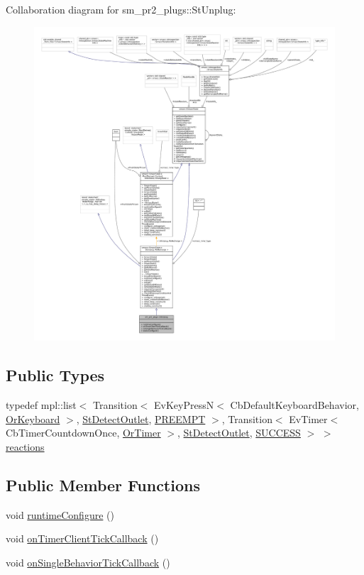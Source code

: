 Collaboration diagram for sm\+\_\+pr2\+\_\+plugs\+:\+:St\+Unplug\+:
\nopagebreak
\begin{figure}[H]
\begin{center}
\leavevmode
\includegraphics[width=350pt]{structsm__pr2__plugs_1_1StUnplug__coll__graph}
\end{center}
\end{figure}
\subsection*{Public Types}
\begin{DoxyCompactItemize}
\item 
typedef mpl\+::list$<$ Transition$<$ Ev\+Key\+PressN$<$ Cb\+Default\+Keyboard\+Behavior, \hyperlink{classsm__pr2__plugs_1_1OrKeyboard}{Or\+Keyboard} $>$, \hyperlink{structsm__pr2__plugs_1_1StDetectOutlet}{St\+Detect\+Outlet}, \hyperlink{classPREEMPT}{P\+R\+E\+E\+M\+PT} $>$, Transition$<$ Ev\+Timer$<$ Cb\+Timer\+Countdown\+Once, \hyperlink{classsm__pr2__plugs_1_1OrTimer}{Or\+Timer} $>$, \hyperlink{structsm__pr2__plugs_1_1StDetectOutlet}{St\+Detect\+Outlet}, \hyperlink{classSUCCESS}{S\+U\+C\+C\+E\+SS} $>$ $>$ \hyperlink{structsm__pr2__plugs_1_1StUnplug_a5e2311ff9af5d5f6391dc9bec1cb477f}{reactions}
\end{DoxyCompactItemize}
\subsection*{Public Member Functions}
\begin{DoxyCompactItemize}
\item 
void \hyperlink{structsm__pr2__plugs_1_1StUnplug_a9a9dac6ed575453e3bbfb115f99277be}{runtime\+Configure} ()
\item 
void \hyperlink{structsm__pr2__plugs_1_1StUnplug_ac3f670b50be1fcd8e3dc0f28f5fafab9}{on\+Timer\+Client\+Tick\+Callback} ()
\item 
void \hyperlink{structsm__pr2__plugs_1_1StUnplug_a2f48107152c97948f7925c6d6225b4bf}{on\+Single\+Behavior\+Tick\+Callback} ()
\end{DoxyCompactItemize}
